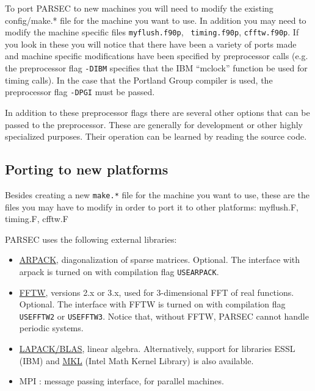\documentclass{article}
\begin{document}
To port PARSEC to new machines you will need to modify the existing 
config/make.* file for the machine you want to use. In addition you may 
need to modify the machine specific files {\tt myflush.f90p}, {\tt 
timing.f90p}, {\tt cfftw.f90p}. If you look in these you will notice 
that there have been a variety of ports made and machine specific 
modifications have been specified by preprocessor calls (e.g. the 
preprocessor flag {\tt -DIBM} specifies that the IBM ``mclock'' function 
be used for timing calls).  In the case that the Portland Group compiler 
is used, the preprocessor flag {\tt -DPGI} must be passed.

In addition to these preprocessor flags there are several other
options that can be passed to the preprocessor. These are generally
for development or other highly specialized purposes. Their operation
can be learned by reading the source code. 



\subsection{Porting to new platforms}

Besides creating a new {\tt make.*} file for the machine you want to use,
these are the files you may have to modify in
order to port it to other platforms: myflush.F, timing.F, cfftw.F

PARSEC uses the following external libraries:

\begin{itemize}
\item \href{http://www.caam.rice.edu/software/ARPACK/}{ARPACK}, diagonalization of sparse matrices. Optional. The interface with arpack is turned on with compilation flag {\tt  USEARPACK}.

\item \href{http://www.fftw.org}{FFTW}, versions 2.x or 3.x,
used for 3-dimensional FFT of real functions. Optional. The interface
with FFTW is turned on with compilation flag {\tt  USEFFTW2} or {\tt USEFFTW3}. Notice that, without FFTW, PARSEC cannot handle periodic systems.

\item \href{http://www.netlib.org/lapack/}{LAPACK/BLAS},
linear algebra. Alternatively, support for libraries 
ESSL (IBM) and \href{http://www.intel.com/cd/software/products/asmo-na/eng/index.htm}{MKL} (Intel Math Kernel Library) is also available.

\item MPI : message passing interface, for parallel machines.

\end{itemize}
\end{document}
